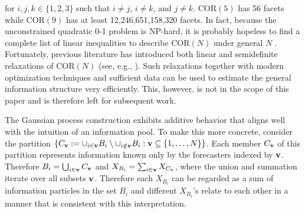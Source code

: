 \documentclass[12pt]{article}
\newcommand{\COR}{\text{COR}}
\theoremstyle{definition}
\theoremstyle{definition}
\def\v{{\bf v}}
\begin{document}
for $i,j,k \in \{1,2,3\}$ such that $i \neq j$, $i \neq k$, and $j \neq k$.  $\COR(5)$ has 56 facets while $\COR(9)$ has at least 12,246,651,158,320 facets. In fact, because the unconstrained quadratic
0-1 problem is NP-hard, it is probably hopeless to find a complete
list of linear inequalities to describe $\COR(N)$ under general $N$
\citep{deza1997geometry}. Fortunately, previous literature has introduced both linear and semidefinite relaxations of $\COR(N)$ (see, e.g., \citealt{laurent1997connections}). Such relaxations together with modern optimization techniques and sufficient data can be used to estimate the general information structure very efficiently. This, however, is not in the scope of this paper and is therefore left for subsequent work. 

The Gaussian process construction exhibits additive behavior that aligns well with the intuition of an information pool. To make this more concrete, consider the partition $\{ C_\v := \cup_{i \in \v} B_i \setminus \cup_{i \notin \v} B_i : \v \subseteq \{1, \dots, N\}\}$. Each member $C_\v$ of this partition represents information known only by the forecasters indexed by $\v$. Therefore $B_i = \bigcup_{i \in \v} C_\v$ and $X_{B_i} = \sum_{i \in \v} X_{C_\v}$, where the union and summation iterate over all subsets $\v$. Therefore each $X_{B_i}$ can be regarded as a sum of information particles in the set $B_i$ and different $X_{B_i}$'s relate to each other in a manner that is consistent with this interpretation. 
\end{document}
